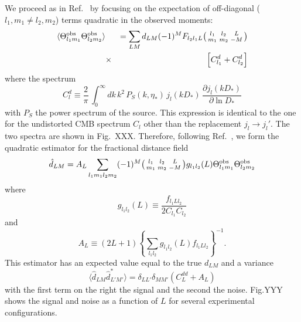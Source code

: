 \documentclass[prl,amsmath,amssymb,floatfix,superscriptaddress,nofootinbib,twocolumn]{revtex4-1}
\def\be{\begin{equation}}
\def\ee{\end{equation}}
\def\bea{\begin{eqnarray}}
\def\eea{\end{eqnarray}}
\newcommand{\vs}{\nonumber\\}
\begin{document}
We proceed as in Ref.~\cite{Hu:2001tn} by focusing on the expectation of off-diagonal (${l_1,m_1\ne l_2,m_2}$) terms quadratic in the observed moments:
\bea
\langle \tob_{l_1m_1} \tob_{l_2m_2} \rangle &&=
\sum_{LM} d_{LM} (-1)^M F_{l_2 l_1L}  \bigl(\begin{smallmatrix} l_1 & l_2 & L \\ m_1 & m_2 & -M  \end{smallmatrix}\bigr) \vs
&\times &\Big[ C_{l_1}^d +C_{l_2}^d\Big]
\vs\eea
where the spectrum
\be
C_{l}^d \equiv \frac{2}{\pi}\,\int_0^\infty dk\,k^2\, P_S(k,\eta_*)\,j_l(kD_*)\,\frac{\partial j_l(kD_*)}{\partial\ln D_*}
\ee
with $P_S$ the power spectrum of the source. This expression is identical to the one for the undistorted CMB spectrum $C_l$ other than the replacement $j_l\rightarrow j_l'$. The two spectra are shown in Fig.~XXX. Therefore, following Ref.~\cite{Okamoto:2003zw}, we form the quadratic estimator for the fractional distance field
\be
\hat d_{LM} = A_{L} \sum_{l_1m_1l_2m_2} (-1)^M  \bigl(\begin{smallmatrix} l_1 & l_2 & L \\ m_1 & m_2 & -M  \end{smallmatrix}\bigr) g_{l_1l_2}(L)  \tob_{l_1m_1} \tob_{l_2m_2}
\ee
where
\be
g_{l_1l_2}(L)\equiv \frac{f_{l_1Ll_2}}{2C_{l_1}C_{l_2}}
\ee
and
\be
A_L \equiv (2L+1) \left\{ \sum_{l_1l_2} g_{l_1l_2}(L)f_{l_1Ll_2}\right\}^{-1}
.\ee 
This estimator has an expected value equal to the true $d_{LM}$ and a variance 
\be
\langle \hat d_{LM} \hat d^*_{L'M'}  \rangle = \delta_{LL'}\delta_{MM'} \left( C_L^{dd} + A_L \right)
\ee
with the first term on the right the signal and the second the noise. Fig.YYY shows the signal and noise as a function of $L$ for several experimental configurations.

 

\end{document}
